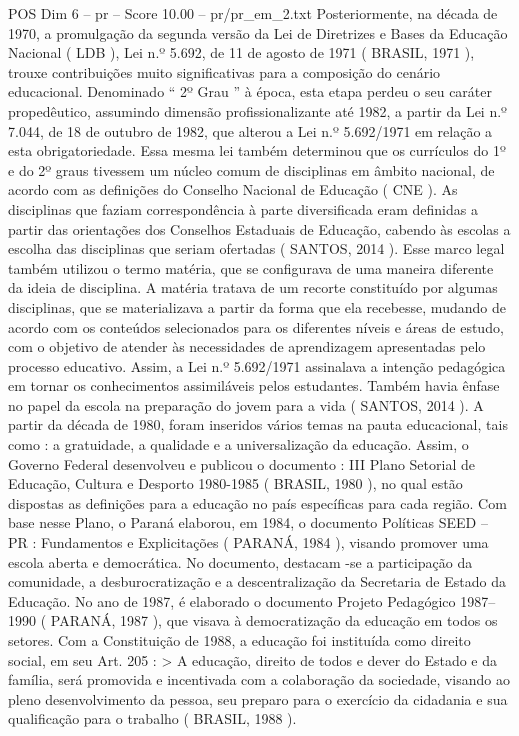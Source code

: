 \begin{textsample}{POS Dim 6 – pr – Score 10.00 – pr/pr\_em\_2.txt}
Posteriormente, na década de 1970, a promulgação da segunda versão da Lei de Diretrizes e Bases da Educação Nacional ( LDB ), Lei n.º 5.692, de 11 de agosto de 1971 ( BRASIL, 1971 ), trouxe contribuições muito significativas para a composição do cenário educacional.
Denominado “ 2º Grau ” à época, esta etapa perdeu o seu caráter propedêutico, assumindo dimensão profissionalizante até 1982, a partir da Lei n.º 7.044, de 18 de outubro de 1982, que alterou a Lei n.º 5.692/1971 em relação a esta obrigatoriedade.
Essa mesma lei também determinou que os currículos do 1º e do 2º graus tivessem um núcleo comum de disciplinas em âmbito nacional, de acordo com as definições do Conselho Nacional de Educação ( CNE ).
As disciplinas que faziam correspondência à parte diversificada eram definidas a partir das orientações dos Conselhos Estaduais de Educação, cabendo às escolas a escolha das disciplinas que seriam ofertadas ( SANTOS, 2014 ).
Esse marco legal também utilizou o termo matéria, que se configurava de uma maneira diferente da ideia de disciplina.
A matéria tratava de um recorte constituído por algumas disciplinas, que se materializava a partir da forma que ela recebesse, mudando de acordo com os conteúdos selecionados para os diferentes níveis e áreas de estudo, com o objetivo de atender às necessidades de aprendizagem apresentadas pelo processo educativo.
Assim, a Lei n.º 5.692/1971 assinalava a intenção pedagógica em tornar os conhecimentos assimiláveis pelos estudantes.
Também havia ênfase no papel da escola na preparação do jovem para a vida ( SANTOS, 2014 ).
A partir da década de 1980, foram inseridos vários temas na pauta educacional, tais como : a gratuidade, a qualidade e a universalização da educação.
Assim, o Governo Federal desenvolveu e publicou o documento : III Plano Setorial de Educação, Cultura e Desporto 1980-1985 ( BRASIL, 1980 ), no qual estão dispostas as definições para a educação no país específicas para cada região.
Com base nesse Plano, o Paraná elaborou, em 1984, o documento Políticas SEED – PR : Fundamentos e Explicitações ( PARANÁ, 1984 ), visando promover uma escola aberta e democrática.
No documento, destacam -se a participação da comunidade, a desburocratização e a descentralização da Secretaria de Estado da Educação.
No ano de 1987, é elaborado o documento Projeto Pedagógico 1987–1990 ( PARANÁ, 1987 ), que visava à democratização da educação em todos os setores.
Com a Constituição de 1988, a educação foi instituída como direito social, em seu Art. 205 : > A educação, direito de todos e dever do Estado e da família, será promovida e incentivada com a colaboração da sociedade, visando ao pleno desenvolvimento da pessoa, seu preparo para o exercício da cidadania e sua qualificação para o trabalho ( BRASIL, 1988 ).

\end{textsample}
